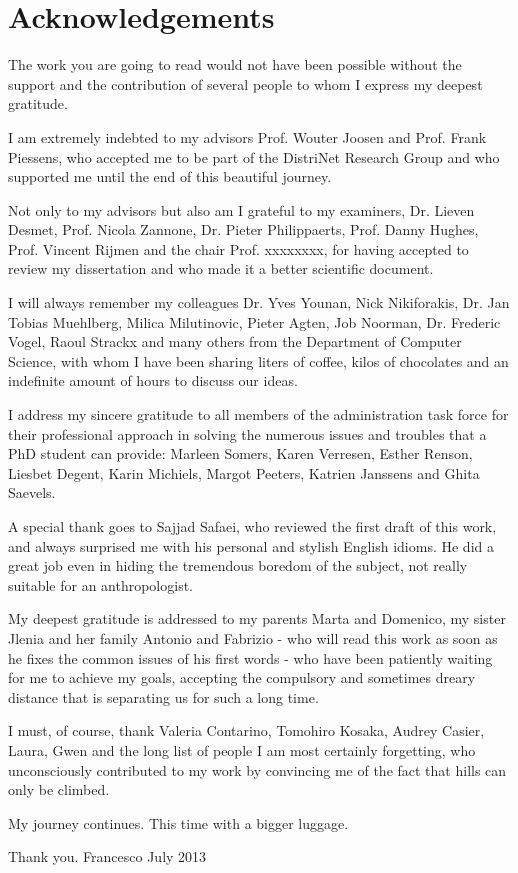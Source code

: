 \section*{Acknowledgements}
The work you are going to read would not have been possible without the support and the contribution of several people to whom I express my deepest gratitude.

I am extremely indebted to my advisors Prof. Wouter Joosen and Prof. Frank Piessens, who accepted me to be part of the DistriNet Research Group and who supported me until the end of this beautiful journey.  

Not only to my advisors but also am I grateful to my examiners, Dr. Lieven Desmet, Prof. Nicola Zannone, Dr. Pieter Philippaerts, Prof. Danny Hughes, Prof. Vincent Rijmen and the chair Prof. xxxxxxxx, for having accepted to review my dissertation and who made it a better scientific document.

I will always remember my colleagues Dr. Yves Younan, Nick Nikiforakis, Dr. Jan Tobias Muehlberg, Milica Milutinovic, Pieter Agten, Job Noorman, Dr. Frederic Vogel, Raoul Strackx and many others from the Department of Computer Science, with whom I have been sharing liters of coffee, kilos of chocolates and an indefinite amount of hours to discuss our ideas.

I address my sincere gratitude to all members of the administration task force for their professional approach in solving the numerous issues and troubles that a PhD student can provide: Marleen Somers, Karen Verresen, Esther Renson, Liesbet Degent, Karin Michiels, Margot Peeters, Katrien Janssens and Ghita Saevels.

A special thank goes to Sajjad Safaei, who reviewed the first draft of this work, and always surprised me with his personal and stylish English idioms. He did a great job even in hiding the tremendous boredom of the subject, not really suitable for an anthropologist.

My deepest gratitude is addressed to my parents Marta and Domenico, my sister Jlenia and her family Antonio and Fabrizio - who will read this work as soon as he fixes the common issues of his first words - who have been patiently waiting for me to achieve my goals, accepting the compulsory and sometimes dreary distance that is separating us for such a long time.

I must, of course, thank Valeria Contarino, Tomohiro Kosaka, Audrey Casier, Laura, Gwen and the long list of people I am most certainly forgetting, who unconsciously contributed to my work by convincing me of the fact that hills can only be climbed.  

My journey continues. This time with a bigger luggage.

Thank you.
Francesco
July 2013
